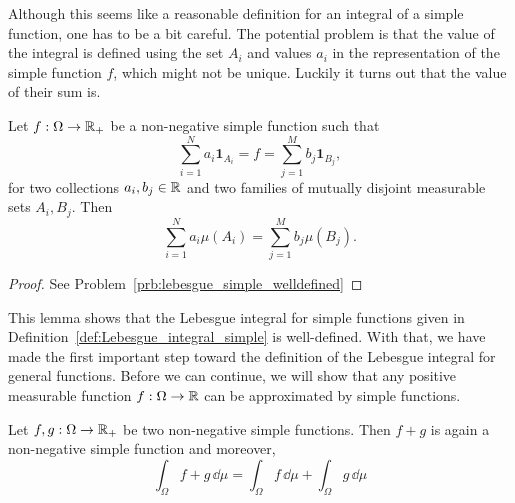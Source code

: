 Although this seems like a reasonable definition for an integral of a simple function, one has to be a bit careful. The potential problem is that the value of the integral is defined using the set $A_i$ and values $a_i$ in the representation of the simple function $f$, which might not be unique. Luckily it turns out that the value of their sum is.

\begin{lemma}\label{lem:lebesgue_simple_welldefined}
Let $f: \Omega \to \mathbb R_+$ be a non-negative simple function such that
\[
	\sum_{i = 1}^N a_i \mathbf{1}_{A_i} = f = \sum_{j = 1}^M b_j \mathbf{1}_{B_j},
\]
for two collections $a_i, b_j \in \mathbb R$ and two families of mutually disjoint measurable sets $A_i, B_j$. Then
\[
	\sum_{i = 1}^N a_i \mu(A_i)= \sum_{j = 1}^M b_j \mu(B_j).
\]
\end{lemma}

\begin{proof}
See Problem~\ref{prb:lebesgue_simple_welldefined}
\end{proof}

This lemma shows that the Lebesgue integral for simple functions given in Definition~\ref{def:Lebesgue_integral_simple} is well-defined. With that, we have made the first important step toward the definition of the Lebesgue integral for general functions. Before we can continue, we will show that any positive measurable function $f : \Omega \to \mathbb R$ can be approximated by simple functions.

\begin{lemma}\label{lem:linearity_lebesgue_simple}
Let $f, g: \Omega \to \mathbb R_+$ be two non-negative simple functions. Then $f+g$ is again a non-negative simple function and moreover,
\[
	\int_\Omega f + g \, \dd \mu = \int_\Omega f\, \dd \mu + \int_\Omega g\, \dd \mu
\]
\end{lemma}

